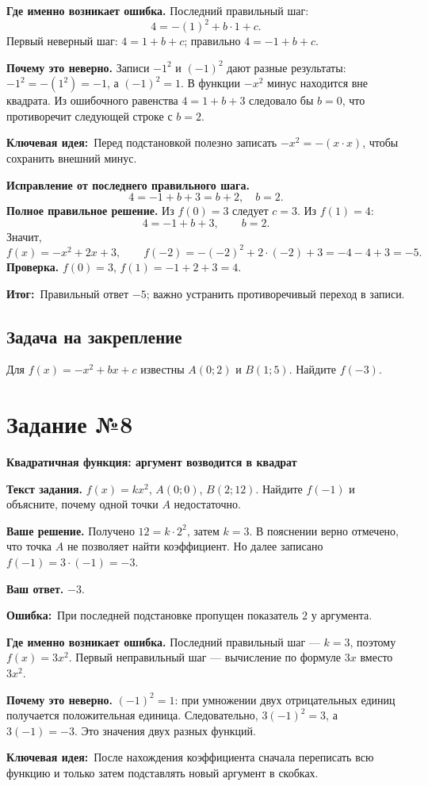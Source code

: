 \documentclass[a4paper,12pt]{article}
\newcommand{\err}{\textcolor{wrong}{\textbf{Ошибка:}}}
\newcommand{\idea}{\textcolor{accent}{\textbf{Ключевая идея:}}}
\newcommand{\res}{\textcolor{accent}{\textbf{Итог:}}}
\newcommand{\taskstart}[2]{\clearpage\phantomsection\label{task:#1}\section*{Задание №#1}\textcolor{accent}{\textbf{#2}}\par\medskip}
\begin{document}
\textbf{Где именно возникает ошибка.} Последний правильный шаг:
\[
4=-(1)^2+b\cdot1+c.
\]
Первый неверный шаг: $4=1+b+c$; правильно $4=-1+b+c$.

\textbf{Почему это неверно.} Записи $-1^2$ и $(-1)^2$ дают разные результаты: $-1^2=-(1^2)=-1$, а $(-1)^2=1$. В функции $-x^2$ минус находится вне квадрата. Из ошибочного равенства $4=1+b+3$ следовало бы $b=0$, что противоречит следующей строке с $b=2$.

\idea\ Перед подстановкой полезно записать $-x^2=-(x\cdot x)$, чтобы сохранить внешний минус.

\textbf{Исправление от последнего правильного шага.}
\[
4=-1+b+3=b+2,\quad b=2.
\]
\textbf{Полное правильное решение.} Из $f(0)=3$ следует $c=3$. Из $f(1)=4$:
\[
4=-1+b+3,\qquad b=2.
\]
Значит,
\[
f(x)=-x^2+2x+3,
\qquad f(-2)=-(-2)^2+2\cdot(-2)+3
=-4-4+3=\boxed{-5}.
\]
\textbf{Проверка.} $f(0)=3$, $f(1)=-1+2+3=4$.

\res\ Правильный ответ $-5$; важно устранить противоречивый переход в записи.

\subsection*{Задача на закрепление}
Для $f(x)=-x^2+bx+c$ известны $A(0;2)$ и $B(1;5)$. Найдите $f(-3)$.

\taskstart{8}{Квадратичная функция: аргумент возводится в квадрат}
\textbf{Текст задания.} $f(x)=kx^2$, $A(0;0)$, $B(2;12)$. Найдите $f(-1)$ и объясните, почему одной точки $A$ недостаточно.

\textbf{Ваше решение.} Получено $12=k\cdot2^2$, затем $k=3$. В пояснении верно отмечено, что точка $A$ не позволяет найти коэффициент. Но далее записано $f(-1)=3\cdot(-1)=-3$.

\textbf{Ваш ответ.} $-3$.

\err\ При последней подстановке пропущен показатель $2$ у аргумента.

\textbf{Где именно возникает ошибка.} Последний правильный шаг --- $k=3$, поэтому $f(x)=3x^2$. Первый неправильный шаг --- вычисление по формуле $3x$ вместо $3x^2$.

\textbf{Почему это неверно.} $(-1)^2=1$: при умножении двух отрицательных единиц получается положительная единица. Следовательно, $3(-1)^2=3$, а $3(-1)=-3$. Это значения двух разных функций.

\idea\ После нахождения коэффициента сначала переписать всю функцию и только затем подставлять новый аргумент в скобках.
\end{document}
